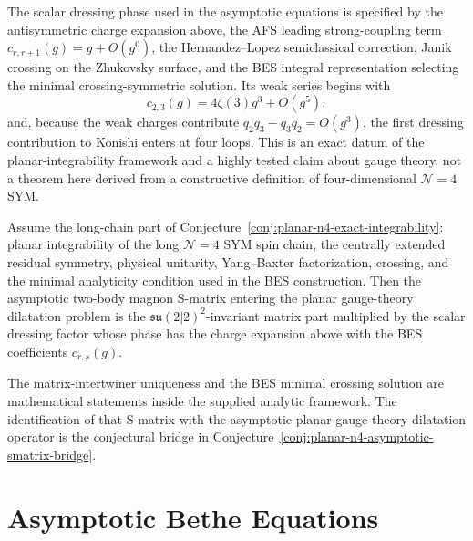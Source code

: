 \begin{definition}
\label{def:planar-n4-dressing-phase-data}
The scalar dressing phase used in the asymptotic equations is specified by
the antisymmetric charge expansion above, the AFS leading strong-coupling
term \(c_{r,r+1}(g)=g+O(g^0)\), the Hernandez--Lopez semiclassical
correction, Janik crossing on the Zhukovsky surface, and the BES integral
representation selecting the minimal crossing-symmetric solution.  Its weak
series begins with
\[
  c_{2,3}(g)=4\zeta(3)g^3+O(g^5),
\]
and, because the weak charges contribute \(q_2q_3-q_3q_2=O(g^3)\), the first
dressing contribution to Konishi enters at four loops.  This is an exact
datum of the planar-integrability framework and a highly tested claim about
gauge theory, not a theorem here derived from a constructive definition of
four-dimensional \(\mathcal N=4\) SYM.
\end{definition}

\begin{conjecture}
\label{conj:planar-n4-asymptotic-smatrix-bridge}
Assume the long-chain part of
Conjecture~\ref{conj:planar-n4-exact-integrability}: planar integrability of
the long \(\mathcal N=4\) SYM spin chain, the centrally extended residual
symmetry, physical unitarity, Yang--Baxter factorization, crossing, and the
minimal analyticity condition used in the BES construction.  Then the
asymptotic two-body magnon S-matrix entering the planar gauge-theory
dilatation problem is the \(\mathfrak{su}(2|2)^2\)-invariant matrix part
multiplied by the scalar dressing factor whose phase has the charge expansion
above with the BES coefficients \(c_{r,s}(g)\).
\end{conjecture}

The matrix-intertwiner uniqueness and the BES minimal crossing solution are
mathematical statements inside the supplied analytic framework.  The
identification of that S-matrix with the asymptotic planar gauge-theory
dilatation operator is the conjectural bridge in
Conjecture~\ref{conj:planar-n4-asymptotic-smatrix-bridge}.

\section{Asymptotic Bethe Equations}

